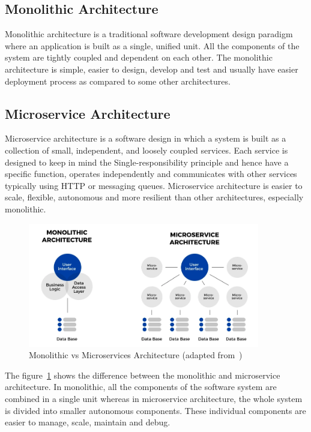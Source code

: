 \subsection{Monolithic Architecture}
Monolithic architecture is a traditional software development design paradigm where an application is built as a single, unified unit. All the components of the system are tightly coupled and dependent on each other. The monolithic architecture is simple, easier to design, develop and test and usually have easier deployment process as compared to some other architectures.

\subsection{Microservice Architecture}
Microservice architecture is a software design in which a system is built as a collection of small, independent, and loosely coupled services. Each service is designed to keep in mind the Single-responsibility principle and hence have a specific function, operates independently and communicates with other services typically using HTTP or messaging queues. Microservice architecture is easier to scale, flexible, autonomous and more resilient than other architectures, especially monolithic. 

\begin{figure}[H]
    \centering
    \includegraphics[width=0.9\textwidth]{figures/monolithic_microservices.png}
    \caption{Monolithic vs Microservices Architecture (adapted from~\cite{atlassian_microservices_vs_monolith})}
	\label{fig_background_monolithic_microservices}
\end{figure}

The figure~\ref{fig_background_monolithic_microservices} shows the difference between the monolithic and microservice architecture. In monolithic, all the components of the software system are combined in a single unit whereas in microservice architecture, the whole system is divided into smaller autonomous components. These individual components are easier to manage, scale, maintain and debug.

